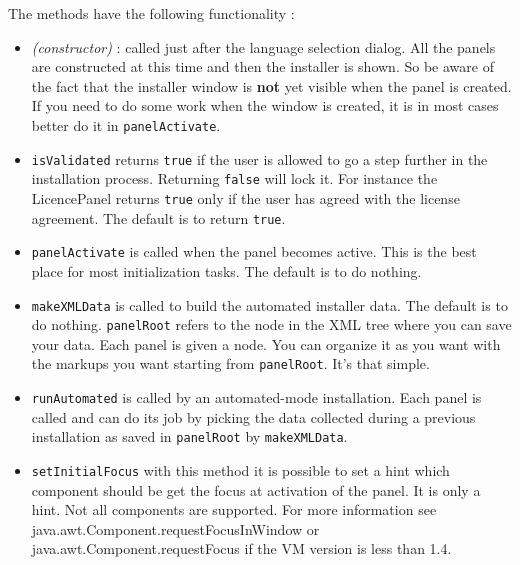 The methods have the following functionality :\\
\begin{itemize}

  \item \textit{(constructor)} : called just after the language
  selection dialog. All the panels are constructed at this time and then
  the installer is shown. So be aware of the fact that the installer
  window is \textbf{not} yet visible when the panel is created. If you
  need to do some work when the window is created, it is in most cases
  better do it in \texttt{panelActivate}.\\

  \item \texttt{isValidated} returns \texttt{true} if the user is
  allowed to go a step further in the installation process. Returning
  \texttt{false} will lock it. For instance the LicencePanel returns
  \texttt{true} only if the user has agreed with the license agreement.
  The default is to return \texttt{true}.\\

  \item \texttt{panelActivate} is called when the panel becomes active.
  This is the best place for most initialization tasks. The default is
  to do nothing.\\

  \item \texttt{makeXMLData} is called to build the automated installer
  data. The default is to do nothing. \texttt{panelRoot} refers to the
  node in the XML tree where you can save your data. Each panel is given
  a node. You can organize it as you want with the markups you want
  starting from \texttt{panelRoot}. It's that simple.\\

  \item \texttt{runAutomated} is called by an automated-mode
  installation. Each panel is called and can do its job by picking the
  data collected during a previous installation as saved in
  \texttt{panelRoot} by \texttt{makeXMLData}.\\

  \item \texttt{setInitialFocus} with this method it is possible to set
  a hint which component should be get the focus at activation of the
  panel. It is only a hint. Not all components are supported. For more
  information see java.awt.Component.requestFocusInWindow or 
  java.awt.Component.requestFocus if the VM version is less than 1.4.\\
  

\end{itemize}
